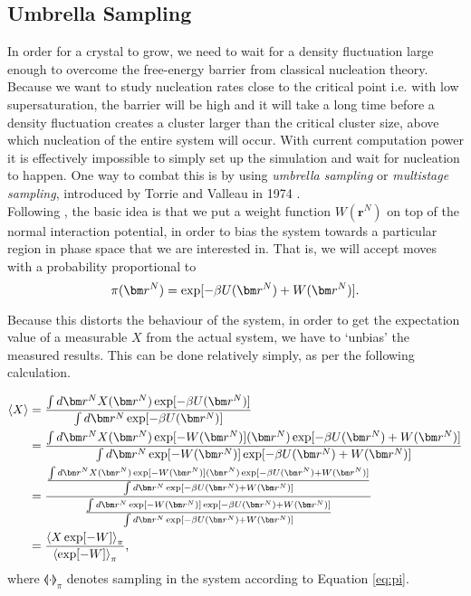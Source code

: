 \documentclass[thesis]{subfiles}
\begin{document}
\subsection{Umbrella Sampling}\label{subsec:US}

In order for a crystal to grow, we need to wait for a density fluctuation large enough to overcome the free-energy barrier from classical nucleation theory. Because we want to study nucleation rates close to the critical point i.e. with low supersaturation, the barrier will be high and it will take a long time before a density fluctuation creates a cluster larger than the critical cluster size, above which nucleation of the entire system will occur.  With current computation power it is effectively impossible to simply set up the simulation and wait for nucleation to happen. One way to combat this is by using \emph{umbrella sampling} or \emph{multistage sampling}, introduced by Torrie and Valleau in 1974 \cite{torrie1974monte}.\\

Following \cite{allen2004introduction}, the basic idea is that we put a weight function $W(\bm r^N)$ on top of the normal interaction potential, in order to bias the system towards a particular region in phase space that we are interested in. That is, we will accept moves with a probability proportional to
\begin{equation}
\pi\argr = \exp [-\beta U\argr + W\argr].
\end{equation}\label{eq:pi}

Because this distorts the behaviour of the system, in order to get the expectation value of a measurable $X$ from the actual system, we have to `unbias' the measured results. This can be done relatively simply, as per the following calculation.

\begin{align}
	\llangle X \rrangle &= \frac{
		\int d\bm r^N X\argr \exp[-\beta U\argr]
	}{
		\int d\bm r^N \exp[-\beta U\argr]
	}\\
	&= \frac{
		\int d\bm r^N X\argr \exp[-W\argr] \argr \exp[-\beta U\argr + W\argr]
	}{
		\int d\bm r^N \exp[-W\argr] \exp[-\beta U\argr + W\argr]
	}\\
	&= \frac{
		\frac{
			\int d\bm r^N X\argr \exp[-W\argr] \argr \exp[-\beta U\argr + W\argr]
		}{
			\int d\bm r^N \exp[-\beta U\argr + W\argr]
		}
	}{
		\frac{
			\int d\bm r^N \exp[-W\argr] \exp[-\beta U\argr + W\argr]
		}{
			\int d\bm r^N \exp[-\beta U\argr + W\argr]
		}
	}\\
	&= \frac{
		\llangle X \exp[-W] \rrangle_\pi
	}{
		\llangle \exp[-W] \rrangle_\pi
	},
\end{align}
where $\llangle \cdot \rrangle_\pi$ denotes sampling in the system according to Equation \ref{eq:pi}. 
\end{document}
